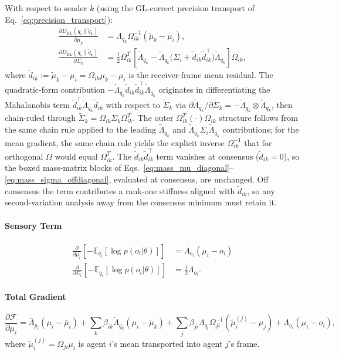 \documentclass[11pt]{article}
\begin{document}
With respect to sender $k$ (using the GL-correct precision transport of Eq.~\eqref{eq:precision_transport}):
\begin{align}
\frac{\partial D_{\mathrm{KL}}(q_i \| \tilde{q}_k)}{\partial \mu_k} &= \Lambda_{q_k}\Omega_{ik}^{-1}(\tilde{\mu}_k - \mu_i), \\
\frac{\partial D_{\mathrm{KL}}(q_i \| \tilde{q}_k)}{\partial \Sigma_k} &= \frac{1}{2}\Omega_{ik}^T\left[\tilde{\Lambda}_{q_k} - \tilde{\Lambda}_{q_k}\big(\Sigma_i + \tilde{d}_{ik}\tilde{d}_{ik}^\top\big)\tilde{\Lambda}_{q_k}\right]\Omega_{ik},
\end{align}
where $\tilde{d}_{ik} := \tilde{\mu}_k - \mu_i = \Omega_{ik}\mu_k - \mu_i$ is the receiver-frame mean residual. The quadratic-form contribution $-\tilde{\Lambda}_{q_k}\tilde{d}_{ik}\tilde{d}_{ik}^\top\tilde{\Lambda}_{q_k}$ originates in differentiating the Mahalanobis term $\tilde{d}_{ik}^\top \tilde{\Lambda}_{q_k}\tilde{d}_{ik}$ with respect to $\tilde{\Sigma}_k$ via $\partial \tilde{\Lambda}_{q_k}/\partial \tilde{\Sigma}_k = -\tilde{\Lambda}_{q_k}\otimes\tilde{\Lambda}_{q_k}$, then chain-ruled through $\tilde{\Sigma}_k = \Omega_{ik}\Sigma_k\Omega_{ik}^T$. The outer $\Omega_{ik}^T(\cdot)\Omega_{ik}$ structure follows from the same chain rule applied to the leading $\tilde{\Lambda}_{q_k}$ and $\tilde{\Lambda}_{q_k}\Sigma_i\tilde{\Lambda}_{q_k}$ contributions; for the mean gradient, the same chain rule yields the explicit inverse $\Omega_{ik}^{-1}$ that for orthogonal $\Omega$ would equal $\Omega_{ik}^T$. The $\tilde{d}_{ik}\tilde{d}_{ik}^\top$ term vanishes at consensus ($\tilde{d}_{ik} = 0$), so the boxed mass-matrix blocks of Eqs.~\eqref{eq:mass_mu_diagonal}--\eqref{eq:mass_sigma_offdiagonal}, evaluated at consensus, are unchanged. Off consensus the term contributes a rank-one stiffness aligned with $\tilde{d}_{ik}$, so any second-variation analysis away from the consensus minimum must retain it.

\paragraph{Sensory Term}
\begin{align}
\frac{\partial}{\partial \mu_i}\left[-\mathbb{E}_{q_i}[\log p(o_i | \theta)]\right] &= \Lambda_{o_i}(\mu_i - o_i) \\
\frac{\partial}{\partial \Sigma_i}\left[-\mathbb{E}_{q_i}[\log p(o_i | \theta)]\right] &= \frac{1}{2}\Lambda_{o_i}.
\end{align}

\paragraph{Total Gradient}
\begin{equation}
\frac{\partial \mathcal{F}}{\partial \mu_i} = \bar{\Lambda}_{p_i}(\mu_i - \bar{\mu}_i) + \sum_k \beta_{ik}\tilde{\Lambda}_{q_k}(\mu_i - \tilde{\mu}_k) + \sum_j \beta_{ji}\Lambda_{q_i}\Omega_{ji}^{-1}(\tilde{\mu}_i^{(j)} - \mu_j) + \Lambda_{o_i}(\mu_i - o_i),
\label{eq:total_gradient_mu}
\end{equation}
where $\tilde{\mu}_i^{(j)} = \Omega_{ji}\mu_i$ is agent $i$'s mean transported into agent $j$'s frame.
\end{document}
